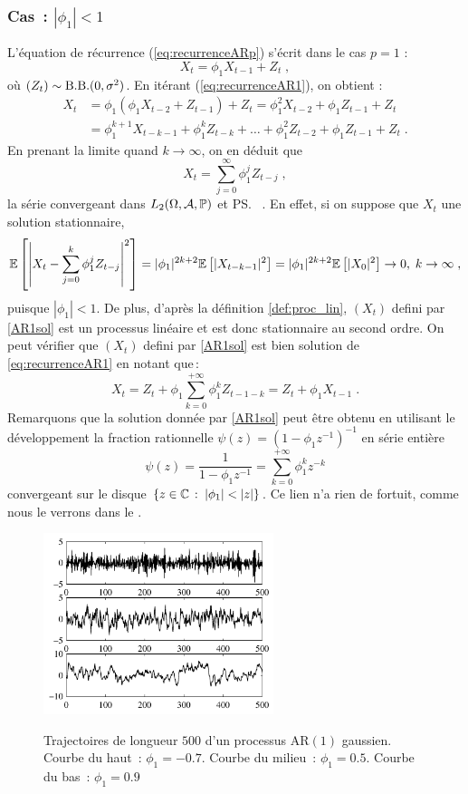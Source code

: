\subsubsection{Cas~: $|\phi_1| < 1$}
L'\'equation de r\'ecurrence (\ref{eq:recurrenceARp}) s'\'ecrit dans le cas $p=1$ :
\begin{equation}
\label{eq:recurrenceAR1}
        X_{t} = \phi_1 X_{t-1} + Z_{t}\;,
\end{equation}
o\`u $(Z_t)\sim\mathrm{B.B.}(0,\sigma^2)$. En it\'erant (\ref{eq:recurrenceAR1}),
on obtient :
\begin{align*}
X_t&=\phi_1(\phi_1 X_{t-2}+Z_{t-1})+Z_t=\phi_1^2 X_{t-2}+\phi_1 Z_{t-1}+Z_t\\
&=\phi_1^{k+1} X_{t-k-1}+\phi_1^k Z_{t-k}+\dots+\phi_1^2 Z_{t-2}+\phi_1 Z_{t-1}
+Z_t\;.
\end{align*}
En prenant la limite quand $k \to \infty$, on en d\'eduit que
\begin{equation}\label{AR1sol}
X_t=\sum_{j=0}^{\infty}\phi_1^j Z_{t-j}\;,
\end{equation}
la s\'erie convergeant dans $L_2(\Omega,\mathcal{A},\mathbb{P})$ et \ps\ .
En effet, si on suppose que $X_t$ une solution stationnaire,
$$
{\mathbb E}\left[ \left|X_t-\sum_{j=0}^{k}\phi_1^j Z_{t-j}\right|^2 \right]
=|\phi_1|^{2k+2} {\mathbb E}\left[ |X_{t-k-1}|^2 \right]=|\phi_1|^{2k+2} {\mathbb E}\left[ |X_0|^2 \right]\to 0,\;
k\to\infty\;,
$$
puisque $|\phi_1| < 1$. De plus, d'apr\`es la d\'efinition \ref{def:proc_lin}, $(X_t)$
defini par \eqref{AR1sol} est un processus lin\'eaire et est donc stationnaire
au second ordre. On peut v\'erifier que $(X_t)$
defini par \eqref{AR1sol} est bien solution de \eqref{eq:recurrenceAR1}
en notant que\,:
\[
  X_t = Z_t + \phi_1 \sum_{k=0}^{+\infty} \phi_1^k Z_{t-1-k}
      = Z_t + \phi_1 X_{t-1}\;.
\]
Remarquons que la solution donn\'ee par \eqref{AR1sol} peut \^{e}tre obtenu
en utilisant le d\'eveloppement la fraction rationnelle $\psi(z)=(1-\phi_1
z^{-1} )^{-1}$ en s\'erie enti\`ere
\[
  \psi(z)=\frac{1}{1-\phi_1 z^{-1}} = \sum_{k=0}^{+\infty} \phi_1^k z^{-k}
\]
convergeant sur le disque $\left\{z \in \mathbb{C}\,:\; |\phi_1| < |z|\right\}$.
Ce lien n'a rien de fortuit, comme nous le verrons  dans le .
\begin{figure}
\centering
  \includegraphics[width=0.6\textwidth]{Figures/chronoar1}\\
  \caption{Trajectoires de longueur $500$ d'un processus AR$(1)$ gaussien.
 Courbe du haut~: $\phi_1=-0.7$.
 Courbe du milieu~: $\phi_1=0.5$.
 Courbe du bas~: $\phi_1=0.9$}
 \label{fig:figar1}
\end{figure}


